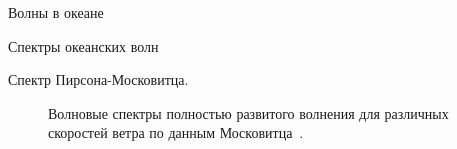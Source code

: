 \begin{chapter}{Волны в океане}
\begin{section}{Спектры океанских волн}
\begin{paragraph}{Спектр Пирсона-Московитца.}
\begin{figure}[t!]
\caption{Волновые спектры полностью развитого волнения для различных скоростей
ветра по данным Московитца~\cite{Moskowitz:1964}.}
\label{fig:PMSpectra}
\end{figure}
%
%


\end{paragraph}
\end{section}
\end{chapter}
